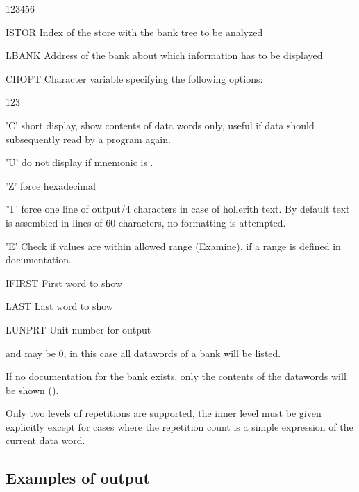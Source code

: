 \begin{DLtt}{123456}
\item[ISTOR]  Index of the store with the bank tree to be analyzed
\item[LBANK]  Address of the bank about which information has to be displayed
\item[CHOPT]  Character variable specifying the following options:
  \begin{DLtt}{123}
     \item['C'] short display, show contents of data words only,
                useful if data should subsequently read by a program again.
     \item['U'] do not display if mnemonic is .
     \item['Z'] force hexadecimal
     \item['T'] force one line of output/4 characters in case of
                hollerith text. By default text is assembled in lines
                of 60 characters, no formatting is attempted.
     \item['E'] Check if values are within allowed range (Examine), if
                a range is defined in documentation.
  \end{DLtt}
\item[IFIRST] First word to show
\item[LAST]   Last word to show
\item[LUNPRT] Unit number for output
\end{DLtt}
 
\finalnewpage

\begin{Notes}
\item {} and  may be 0, in this case all datawords
      of a bank will be listed. 
\item If no documentation for the bank exists, only the contents of the 
      datawords will be shown ().
\item Only two levels of repetitions are supported, the inner level
      must be given explicitly except for cases where the repetition count
      is a simple expression of the current data word.
\end{Notes}
 
\subsection[Examples of {\tt DZDISP} output]{Examples of  output}
 
